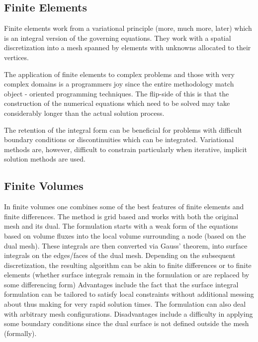 \documentclass[10pt]{article}
\begin{document}
	\subsection{Finite Elements}
	
		Finite elements work from a variational principle (more, much
		more, later) which is an integral version of the 
		governing equations. They work with a spatial discretization
		into a mesh spanned by elements with unknowns allocated
		to their vertices. 
		
		The application of finite elements to complex problems and 
		those with very complex domains is a programmers joy since
		the entire methodology match  object - oriented programming
		techniques. The flip-side of this is that the construction of the
		numerical equations which need to be solved may take considerably
		longer than the actual solution process.
		
		The retention of the integral form can be beneficial for problems with
		difficult boundary conditions or discontinuities which can be integrated.
		Variational methods are, however, difficult to constrain particularly when
		iterative, implicit solution methods are used.
	
	\subsection{Finite Volumes}
		
		In finite volumes one combines some of the best features of 
		finite elements and finite differences. The method is grid based
		and works with both the original mesh and its dual.
		The formulation starts with 
		a weak form of the equations based on volume fluxes into the 
		local volume surrounding a node (based on the dual mesh). 
		These integrals are then converted via Gauss' theorem, into
		surface integrals on the edges/faces of the dual mesh.
		Depending on the subsequent discretization, the resulting algorithm can 
		be akin to finite differences or to finite elements (whether surface
		integrals remain in the formulation or are replaced by some differencing
		form)
		 Advantages include the fact that the surface integral formulation
		 can be tailored to satisfy local constraints without additional messing about
		 thus making for very rapid solution times. The formulation can also deal with
		 arbitrary mesh configurations.
		  Disadvantages include a difficulty in applying some boundary conditions since
		  the dual surface is not defined outside the mesh (formally).
		  
\end{document}
